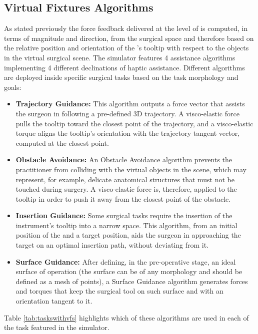 \documentclass[../main.tex]{subfiles}
\begin{document}
\subsection{Virtual Fixtures Algorithms}
As stated previously the force feedback delivered at the level of \mtm is computed, in terms of magnitude and direction, from the surgical space and therefore based on the relative position and orientation of the \psm's tooltip with respect to the objects in the virtual surgical scene. The simulator features 4 assistance algorithms implementing 4 different declinations of haptic assistance. Different algorithms are deployed inside specific surgical tasks based on the task morphology and goals:
\begin{itemize}
  \item \textbf{Trajectory Guidance:} This algorithm outputs a force vector that assists the surgeon in following a pre-defined 3D trajectory. A visco-elastic force pulls the \ee tooltip toward the closest point of the trajectory, and a visco-elastic torque aligns the tooltip's orientation with the trajectory tangent vector, computed at the closest point.
  \item \textbf{Obstacle Avoidance:} An Obstacle Avoidance algorithm prevents the practitioner from colliding with the virtual objects in the scene, which may represent, for example, delicate anatomical structures that must not be touched during surgery. A visco-elastic force is, therefore, applied to the \ee tooltip in order to push it away from the closest point of the obstacle.
  \item \textbf{Insertion Guidance:} Some surgical tasks require the insertion of the instrument's tooltip into a narrow space. This algorithm, from an initial position of the \psm and a target position, aids the surgeon in approaching the target on an optimal insertion path, without deviating from it.
  \item \textbf{Surface Guidance:} After defining, in the pre-operative stage, an ideal surface of operation (the surface can be of any morphology and should be defined as a mesh of points), a Surface Guidance algorithm generates forces and torques that keep the surgical tool on such surface and with an orientation tangent to it. 
\end{itemize} 
Table \ref{tab:taskswithvfs} highlights which of these \vf algorithms are used in each of the task featured in the simulator.
\end{document}
